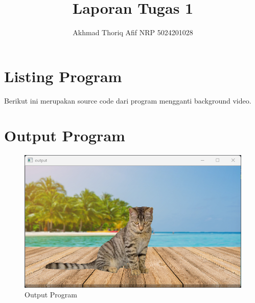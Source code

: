 \documentclass[]{article}
\title{Laporan Tugas 1}
\author{Akhmad Thoriq Afif NRP 5024201028}
\begin{document}
\maketitle
\section{Listing Program}
Berikut ini merupakan source code dari program mengganti background video.

\section{Output Program}
\begin{figure}[H]
    \centering
    \includegraphics[width=12cm]{output.png}
    \caption{Output Program}
\end{figure}
\pagebreak
\end{document}
